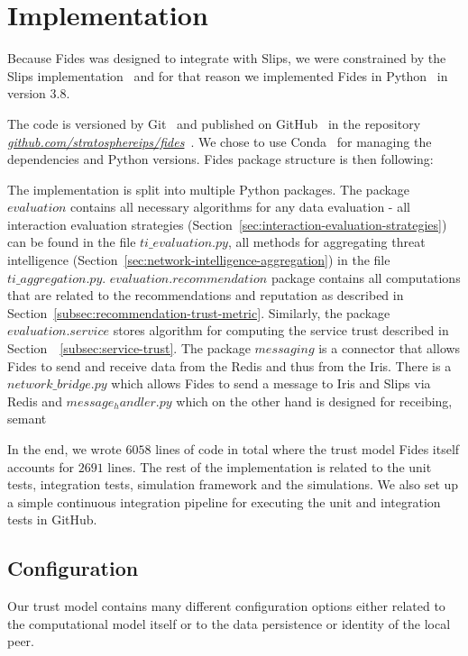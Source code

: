 \section{Implementation}
\label{sec:implementation}
Because Fides was designed to integrate with Slips, we were constrained by the Slips implementation~\cite{slips} and for that reason we implemented Fides in Python~\cite{python} in version 3.8.

The code is versioned by Git~\cite{git} and published on GitHub~\cite{github} in the repository \textit{\href{https://github.com/stratosphereips/fides}{github.com/stratosphereips/fides}}~\cite{fidesGithub}.
We chose to use Conda~\cite{conda} for managing the dependencies and Python versions.
Fides package structure is then following:

\vspace{5mm}
\vspace{5mm}

The implementation is split into multiple Python packages. The package $evaluation$ contains all necessary algorithms for any data evaluation - all interaction evaluation strategies (Section~\ref{sec:interaction-evaluation-strategies}) can be found in the file $ti\_evaluation.py$, all methods for aggregating threat intelligence  (Section~\ref{sec:network-intelligence-aggregation}) in the file $ti\_aggregation.py$.
$evaluation.recommendation$ package contains all computations that are related to the recommendations and reputation as described in Section~\ref{subsec:recommendation-trust-metric}.
Similarly, the package $evaluation.service$ stores algorithm for computing the service trust described in Section~~\ref{subsec:service-trust}.
The package $messaging$ is a connector that allows Fides to send and receive data from the Redis and thus from the Iris.
There is a $network\_bridge.py$ which allows Fides to send a message to Iris and Slips via Redis and $message_handler.py$ which on the other hand is designed for receibing, semant

In the end, we wrote $6058$ lines of code in total where the trust model Fides itself accounts for $2691$ lines. The rest of the implementation is related to the unit tests, integration tests, simulation framework and the simulations.
We also set up a simple continuous integration pipeline for executing the unit and integration tests in GitHub.

\subsection{Configuration}
\label{subsec:configuration}
Our trust model contains many different configuration options either related to the computational model itself or to the data persistence or identity of the local peer.

